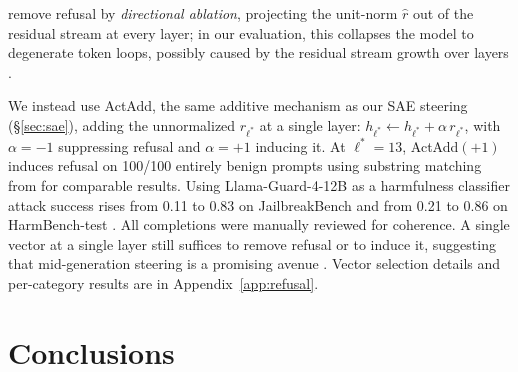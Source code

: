 \documentclass[11pt]{article}
\begin{document}
 \citet{arditi2024refusallanguagemodelsmediated} remove refusal by \emph{directional ablation}, projecting the unit-norm $\hat r$ out of the residual stream at every layer; in our evaluation, this collapses the model to degenerate token loops, possibly caused by the residual stream growth over layers \cite{hex2023residual}.

We instead use ActAdd, the same additive mechanism as our SAE steering (\S\ref{sec:sae}), adding the unnormalized $r_{\ell^{*}}$ at a single layer: $h_{\ell^{*}} \leftarrow h_{\ell^{*}} + \alpha\,r_{\ell^{*}}$, with $\alpha=-1$ suppressing refusal and $\alpha=+1$ inducing it. At
$\ell^{*}=13$, ActAdd$(+1)$ induces refusal on 100/100 entirely benign prompts using substring matching from \citep{arditi2024refusallanguagemodelsmediated} for comparable results. Using Llama-Guard-4-12B \cite{inan2023llamaguardllmbasedinputoutput} as a harmfulness classifier attack success rises from 0.11 to 0.83 on JailbreakBench \cite{chao2024jailbreakbench} and from 0.21 to 0.86 on HarmBench-test \cite{mazeika2024harmbenchstandardizedevaluationframework}. All completions were manually reviewed for coherence. A single vector at a single layer still suffices to remove refusal or to induce it, suggesting that mid-generation steering is a promising avenue \cite{deng2026qwenscopeturningsparsefeatures}. Vector selection details and per-category results are in Appendix~\ref{app:refusal}. 


%




\section{Conclusions}


\end{document}
